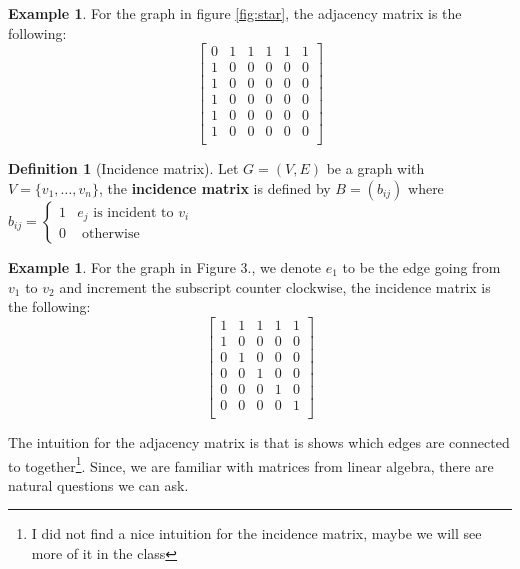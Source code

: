 \documentclass{tufte-handout}
\newcommand{\bra}[1]{\left(#1\right)}
\theoremstyle{definition}
\newtheorem{defn}[thm]{Definition}
\newtheorem{exmp}[thm]{Example}
\theoremstyle{remark}
\begin{document}
\begin{exmp}
	For the graph in figure \ref{fig:star}, the adjacency matrix is the following:
	\[
		\begin{bmatrix}
			0 & 1 & 1 & 1 & 1 & 1\\
			1 & 0 & 0 & 0 & 0 & 0\\
			1 & 0 & 0 & 0 & 0 & 0\\
			1 & 0 & 0 & 0 & 0 & 0\\
			1 & 0 & 0 & 0 & 0 & 0\\
			1 & 0 & 0 & 0 & 0 & 0\\
		\end{bmatrix}
	\]
\end{exmp}
\begin{defn}[Incidence matrix]
	Let $G = (V, E)$ be a graph with $V = \{v_1, \dots, v_n\}$, the \textbf{incidence matrix} is defined by $B = \bra{b_{ij}}$ where $b_{ij} = \begin{cases}1 & e_j \mbox{ is incident to } v_i\\ 0 & \mbox{ otherwise}\end{cases}$
\end{defn}
\begin{exmp}
	For the graph in Figure 3., we denote $e_1$ to be the edge going from $v_1$ to $v_2$ and increment the subscript counter clockwise, the incidence matrix is the following:
	\[
		\begin{bmatrix}
			1 & 1 & 1 & 1 & 1\\
			1 & 0 & 0 & 0 & 0\\
			0 & 1 & 0 & 0 & 0\\
			0 & 0 & 1 & 0 & 0\\
			0 & 0 & 0 & 1 & 0\\
			0 & 0 & 0 & 0 & 1\\
		\end{bmatrix}
	\]
\end{exmp}
The intuition for the adjacency matrix is that is shows which edges are connected to together\footnote{I did not find a nice intuition for the incidence matrix, maybe we will see more of it in the class}. Since, we are familiar with matrices from linear algebra, there are natural questions we can ask.
\end{document}
